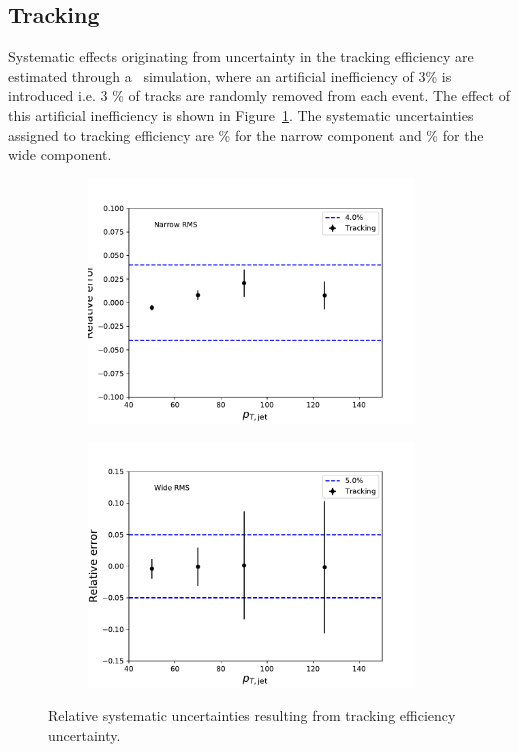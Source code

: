 \subsection{Tracking}
Systematic effects originating from uncertainty in the tracking efficiency are estimated through a \pythia~simulation, where an artificial inefficiency of 3\% is introduced i.e. 3 \% of tracks are randomly removed from each event. The effect of this artificial inefficiency is shown in Figure~\ref{fig:systtrack2}. The systematic uncertainties assigned to tracking efficiency are \unit[4]{\%} for the narrow component and \unit[5]{\%} for the wide component. 

\begin{figure}
\centering
\begin{subfigure}{0.45\textwidth}
\includegraphics[width=0.95\textwidth]{figures/systematics/SystematicErrorsGausRMS_Tracking.pdf}
\end{subfigure}
\begin{subfigure}{0.45\textwidth}
\includegraphics[width=0.95\textwidth]{figures/systematics/SystematicErrorsGammaRMS_Tracking.pdf}
\end{subfigure}
\caption{Relative systematic uncertainties resulting from tracking efficiency uncertainty.}
\label{fig:systtrack2}
\end{figure}

